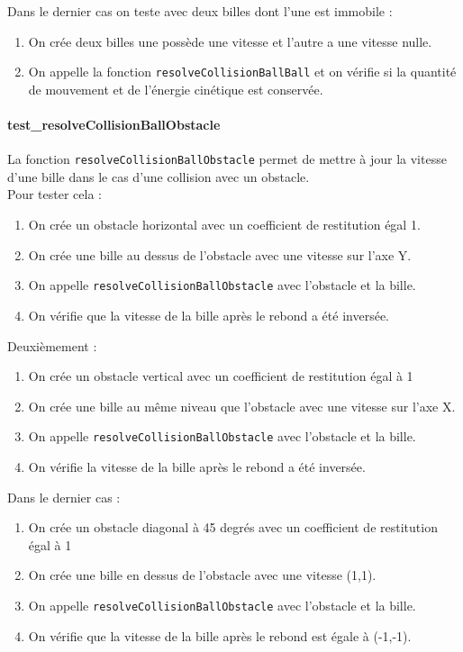 \documentclass{report}
\begin{document}
Dans le dernier cas on teste avec deux billes dont l’une est immobile :

\begin{enumerate}
\item On crée deux billes une possède une vitesse et l’autre a une vitesse nulle.
\item On appelle la fonction \texttt{resolveCollisionBallBall} et on vérifie si la quantité de mouvement et de l’énergie cinétique est conservée.
\end{enumerate}

\paragraph{test\_resolveCollisionBallObstacle}

La fonction \texttt{resolveCollisionBallObstacle} permet de mettre à jour la vitesse d’une bille dans le cas d’une collision avec un obstacle. \\

Pour tester cela : 

\begin{enumerate}
\item On crée un obstacle horizontal avec un coefficient de restitution égal 1.
\item On crée une bille au dessus de l’obstacle avec une vitesse sur l’axe Y.
\item On appelle \texttt{resolveCollisionBallObstacle} avec l’obstacle et la bille.
\item On vérifie que la vitesse de la bille après le rebond a été inversée.\\
\end{enumerate}

Deuxièmement :

\begin{enumerate}
\item On crée un obstacle vertical avec un coefficient de restitution égal à 1
\item On crée une bille au même niveau que l’obstacle avec une vitesse sur l’axe X.
\item On appelle \texttt{resolveCollisionBallObstacle} avec l’obstacle et la bille.
\item On vérifie la vitesse de la bille après le rebond a été inversée.\\
\end{enumerate}

Dans le dernier cas :

\begin{enumerate}
\item On crée un obstacle diagonal à 45 degrés avec un coefficient de restitution égal à 1
\item On crée une bille en dessus de l’obstacle avec une vitesse (1,1).
\item On appelle \texttt{resolveCollisionBallObstacle} avec l’obstacle et la bille.
\item On vérifie que la vitesse de la bille après le rebond est égale à (-1,-1).
\end{enumerate}
\end{document}
